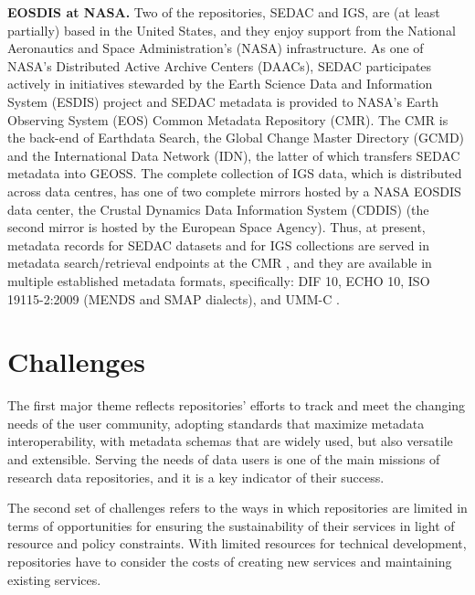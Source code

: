 \documentclass{interact}
\begin{document}
\medskip
\noindent \textbf{EOSDIS at NASA.}
Two of the repositories, SEDAC and IGS, are (at least partially) based in the United States, and they enjoy support from the National Aeronautics and Space Administration's (NASA) infrastructure. 
As one of NASA’s Distributed Active Archive Centers (DAACs), SEDAC participates actively in initiatives stewarded by the Earth Science Data and Information System (ESDIS) project and SEDAC metadata is provided to NASA’s Earth Observing System (EOS) Common Metadata Repository (CMR). The CMR is the back-end of Earthdata Search, the Global Change Master Directory (GCMD) and the International Data Network (IDN), the latter of which transfers SEDAC metadata into GEOSS. 
The complete collection of IGS data, which is distributed across data centres, has one of two complete mirrors hosted by a NASA EOSDIS data center, the Crustal Dynamics Data Information System (CDDIS) (the second mirror is hosted by the European Space Agency). Thus, at present, metadata records for SEDAC datasets and for IGS collections are served in metadata search/retrieval endpoints at the CMR \parencite{noll_cddis_2019}, and they are available in multiple established metadata formats, specifically: DIF 10, ECHO 10, ISO 19115-2:2009 (MENDS and SMAP dialects), and UMM-C \parencite{reiter_cmr_2019}.

\section{Challenges}\label{discussion}
The first major theme reflects repositories' efforts to track and meet the changing needs of the user community, adopting standards that maximize metadata interoperability, with metadata schemas that are widely used, but also versatile and extensible. Serving the needs of data users is one of the main missions of research data repositories, and it is a key indicator of their success. 

The second set of challenges refers to the ways in which repositories are limited in terms of opportunities for ensuring the sustainability of their services in light of resource and policy constraints. With limited resources for technical development, repositories have to consider the costs of creating new services and maintaining existing services. 
\end{document}
